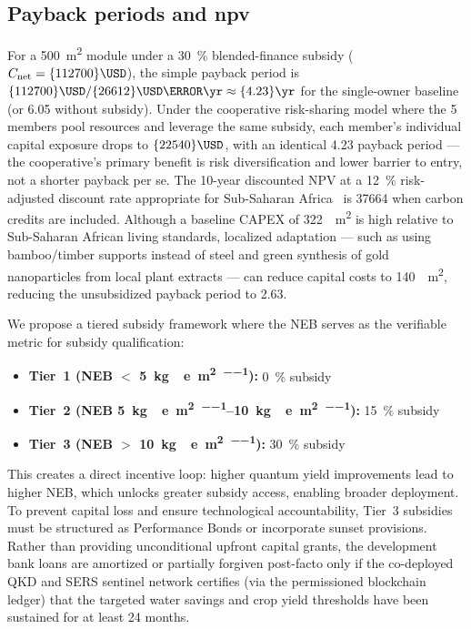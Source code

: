 \documentclass[11pt,a4paper]{article}
\begin{document}
\subsection{Payback periods and npv}

For a \qty{500}{\m\squared} module under a \qty{30}{\percent} blended-finance subsidy ($C_{\mathrm{net}} = \qty{112700}{\USD}$), the simple payback period is $\qty{112700}{\USD} / \qty{26612}{\USD\per\yr} \approx \qty{4.23}{\yr}$ for the single-owner baseline (or \qty{6.05}{\yr} without subsidy). Under the cooperative risk-sharing model where the \num{5} members pool resources and leverage the same subsidy, each member's individual capital exposure drops to $\qty{22540}{\USD}$, with an identical \qty{4.23}{\yr} payback period — the cooperative's primary benefit is risk diversification and lower barrier to entry, not a shorter payback per se. The 10-year discounted NPV at a \qty{12}{\percent} risk-adjusted discount rate appropriate for Sub-Saharan Africa~\cite{Ringstrom2026} is \qty{+37664}{\USD} when carbon credits are included. Although a baseline CAPEX of \qty{322}{\per\m\squared} is high relative to Sub-Saharan African living standards, localized adaptation --- such as using bamboo/timber supports instead of steel and green synthesis of gold nanoparticles from local plant extracts --- can reduce capital costs to \qty{140}{\per\m\squared}, reducing the unsubsidized payback period to \qty{2.63}{\yr}.

We propose a tiered subsidy framework where the NEB serves as the verifiable metric for subsidy qualification:

\begin{itemize}
\item \textbf{Tier~1 (NEB $<$ \qty{5}{\kg{}e\per\m\squared\per\yr}):} \qty{0}{\percent} subsidy
\item \textbf{Tier~2 (NEB \qtyrange{5}{10}{\kg{}e\per\m\squared\per\yr}):} \qty{15}{\percent} subsidy
\item \textbf{Tier~3 (NEB $>$ \qty{10}{\kg{}e\per\m\squared\per\yr}):} \qty{30}{\percent} subsidy
\end{itemize}

This creates a direct incentive loop: higher quantum yield improvements lead to higher NEB, which unlocks greater subsidy access, enabling broader deployment. To prevent capital loss and ensure technological accountability, Tier~3 subsidies must be structured as Performance Bonds or incorporate sunset provisions. Rather than providing unconditional upfront capital grants, the development bank loans are amortized or partially forgiven post-facto only if the co-deployed QKD and SERS sentinel network certifies (via the permissioned blockchain ledger) that the targeted water savings and crop yield thresholds have been sustained for at least 24 months.
\end{document}
